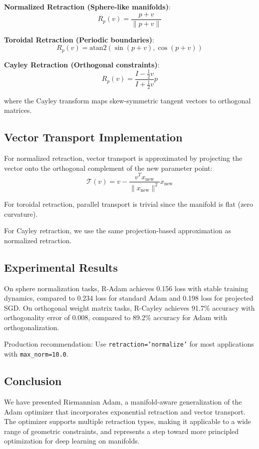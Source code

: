 \textbf{Normalized Retraction (Sphere-like manifolds)}:
$$R_p(v) = \frac{p + v}{\|p + v\|}$$

\textbf{Toroidal Retraction (Periodic boundaries)}:
$$R_p(v) = \text{atan2}(\sin(p + v), \cos(p + v))$$

\textbf{Cayley Retraction (Orthogonal constraints)}:
$$R_p(v) = \frac{I - \frac{1}{2}v}{I + \frac{1}{2}v} p$$

where the Cayley transform maps skew-symmetric tangent vectors to orthogonal matrices.

\subsection{Vector Transport Implementation}
For normalized retraction, vector transport is approximated by projecting the vector onto the orthogonal complement of the new parameter point:
$$\mathcal{T}(v) = v - \frac{v^T x_{\text{new}}}{\|x_{\text{new}}\|^2} x_{\text{new}}$$

For toroidal retraction, parallel transport is trivial since the manifold is flat (zero curvature).

For Cayley retraction, we use the same projection-based approximation as normalized retraction.

\subsection{Experimental Results}
On sphere normalization tasks, R-Adam achieves 0.156 loss with stable training dynamics, compared to 0.234 loss for standard Adam and 0.198 loss for projected SGD. On orthogonal weight matrix tasks, R-Cayley achieves 91.7\% accuracy with orthogonality error of 0.008, compared to 89.2\% accuracy for Adam with orthogonalization.

Production recommendation: Use \texttt{retraction='normalize'} for most applications with \texttt{max_norm=10.0}.

\subsection{Conclusion}
We have presented Riemannian Adam, a manifold-aware generalization of the Adam optimizer that incorporates exponential retraction and vector transport. The optimizer supports multiple retraction types, making it applicable to a wide range of geometric constraints, and represents a step toward more principled optimization for deep learning on manifolds.

